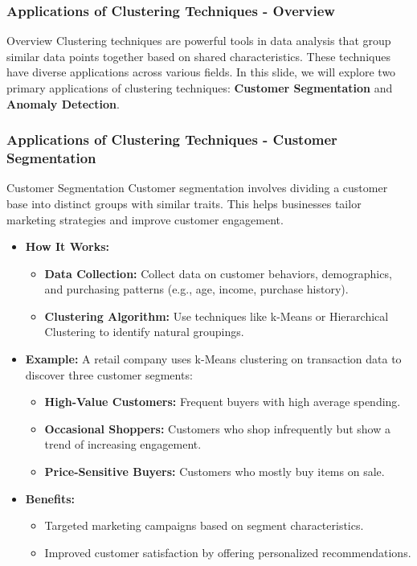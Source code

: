 \documentclass[aspectratio=169]{beamer}
\begin{document}
\begin{frame}[fragile]
    \frametitle{Applications of Clustering Techniques - Overview}
    \begin{block}{Overview}
        Clustering techniques are powerful tools in data analysis that group similar data points together based on shared characteristics. These techniques have diverse applications across various fields. In this slide, we will explore two primary applications of clustering techniques: \textbf{Customer Segmentation} and \textbf{Anomaly Detection}.
    \end{block}
\end{frame}

\begin{frame}[fragile]
    \frametitle{Applications of Clustering Techniques - Customer Segmentation}
    \begin{block}{Customer Segmentation}
        Customer segmentation involves dividing a customer base into distinct groups with similar traits. This helps businesses tailor marketing strategies and improve customer engagement.
    \end{block}

    \begin{itemize}
        \item \textbf{How It Works:}
            \begin{itemize}
                \item \textbf{Data Collection:} Collect data on customer behaviors, demographics, and purchasing patterns (e.g., age, income, purchase history).
                \item \textbf{Clustering Algorithm:} Use techniques like k-Means or Hierarchical Clustering to identify natural groupings.
            \end{itemize}
        
        \item \textbf{Example:} A retail company uses k-Means clustering on transaction data to discover three customer segments:
            \begin{itemize}
                \item \textbf{High-Value Customers:} Frequent buyers with high average spending.
                \item \textbf{Occasional Shoppers:} Customers who shop infrequently but show a trend of increasing engagement.
                \item \textbf{Price-Sensitive Buyers:} Customers who mostly buy items on sale.
            \end{itemize}

        \item \textbf{Benefits:}
            \begin{itemize}
                \item Targeted marketing campaigns based on segment characteristics.
                \item Improved customer satisfaction by offering personalized recommendations.
            \end{itemize}
    \end{itemize}
\end{frame}
\end{document}
